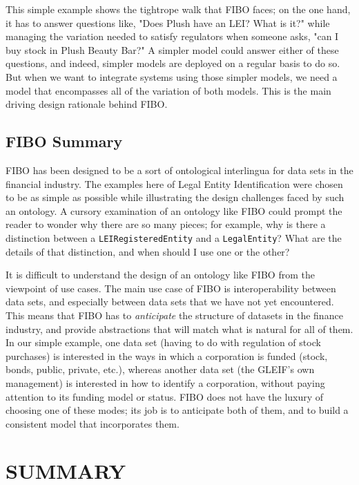 This simple example shows the tightrope walk that FIBO faces; on the one hand, it has to answer questions like, "Does Plush have an LEI?  What is it?"
while managing the variation needed to satisfy regulators when someone asks, "can I buy stock in Plush Beauty Bar?"  A simpler model could answer
either of these questions, and indeed, simpler models are deployed on a regular basis to do so.  But when we want to integrate systems using those
simpler models, we need a model that encompasses all of the variation of both models.  This is the main driving design rationale behind FIBO. 

\subsection{FIBO Summary}

FIBO has been designed to be a sort of ontological interlingua for data sets in the financial industry.  The examples here of Legal 
Entity Identification were chosen to be as simple as possible while illustrating the design challenges faced by such an ontology. 
A cursory examination of an ontology like FIBO could prompt the reader to wonder why there are so many pieces; for example, why is there 
a distinction between a \texttt{LEIRegisteredEntity} and a \texttt{LegalEntity}?  What are the details of that distinction, and when should 
I use one or the other? 

It is difficult to understand the design of an ontology like FIBO from the viewpoint of use cases.  The main use case of FIBO is interoperability 
between data sets, and especially between data sets that we have not yet encountered.  This means that FIBO has to \emph{anticipate} the structure of 
datasets in the finance industry, and provide abstractions that will match what is natural for all of them.  In our simple example, one data
set (having to do with regulation of stock purchases) is interested in the ways in which a corporation is funded (stock, bonds, public, private, etc.),
whereas another data set (the GLEIF's own management) is interested in how to identify a corporation, without paying attention to its funding model
or status.  FIBO does not have the luxury of choosing one of these modes; its job is to anticipate both of them, and to build a consistent 
model that incorporates them.


\section{SUMMARY}

